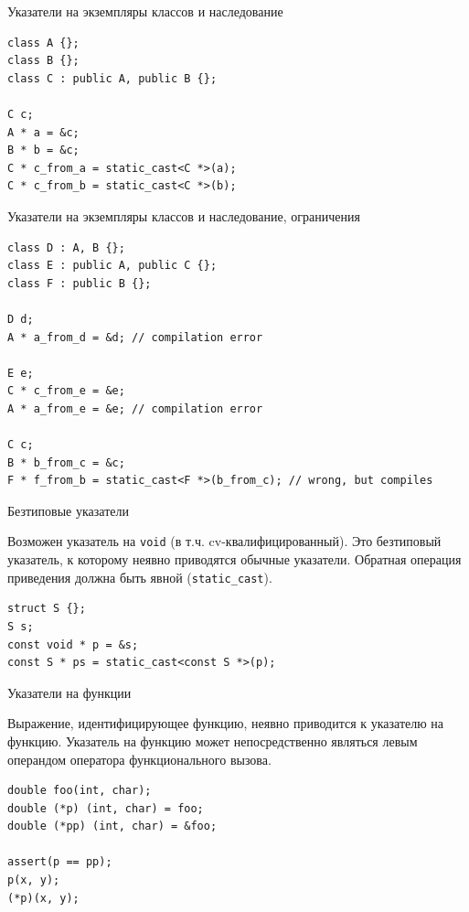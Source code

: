 \documentclass[unknownkeysallowed,xcolor=table]{beamer}
\begin{document}
\begin{frame}[fragile]{Указатели на экземпляры классов и наследование}

\begin{lstlisting}
class A {};
class B {};
class C : public A, public B {};

C c;
A * a = &c;
B * b = &c;
C * c_from_a = static_cast<C *>(a);
C * c_from_b = static_cast<C *>(b);
\end{lstlisting}

\end{frame}

\begin{frame}[fragile]{Указатели на экземпляры классов и наследование, ограничения}

\begin{lstlisting}
class D : A, B {};
class E : public A, public C {};
class F : public B {};

D d;
A * a_from_d = &d; // compilation error

E e;
C * c_from_e = &e;
A * a_from_e = &e; // compilation error

C c;
B * b_from_c = &c;
F * f_from_b = static_cast<F *>(b_from_c); // wrong, but compiles
\end{lstlisting}

\end{frame}

\begin{frame}[fragile]{Безтиповые указатели}

Возможен указатель на \lstinline{void} (в т.ч. cv-квалифицированный). Это безтиповый указатель, к которому неявно приводятся обычные указатели. Обратная операция приведения должна быть явной (\lstinline{static_cast}).

\vspace{2em}

\begin{lstlisting}
struct S {};
S s;
const void * p = &s;
const S * ps = static_cast<const S *>(p);
\end{lstlisting}

\end{frame}

\begin{frame}[fragile]{Указатели на функции}

Выражение, идентифицирующее функцию, неявно приводится к указателю на функцию. Указатель на функцию может непосредственно являться левым операндом оператора функционального вызова.

\vspace{1em}

\begin{lstlisting}
double foo(int, char);
double (*p) (int, char) = foo;
double (*pp) (int, char) = &foo;

assert(p == pp);
p(x, y);
(*p)(x, y);
\end{lstlisting}

\end{frame}
\end{document}
